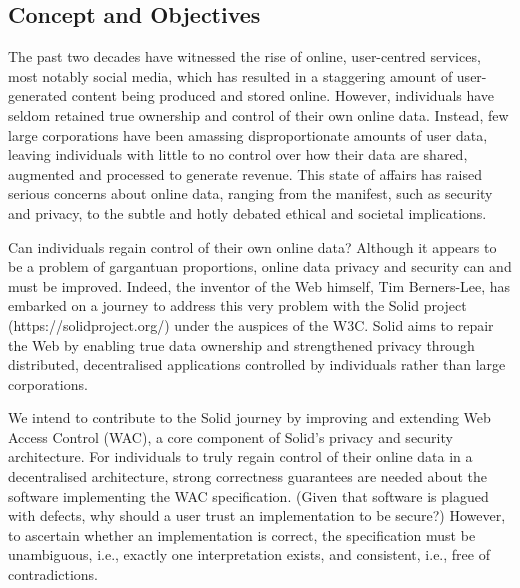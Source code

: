 \subsection{Concept and Objectives}

The past two decades have witnessed the rise of online, user-centred
services, most notably social media, which has resulted in a staggering
amount of user-generated content being produced and stored online.
However, individuals have seldom retained true ownership and control
of their own online data. Instead, few large corporations have been
amassing disproportionate amounts of user data, leaving individuals
with little to no control over how their data are shared, augmented
and processed to generate revenue. This state of affairs has raised
serious concerns about online data, ranging from the manifest, such
as security and privacy, to the subtle and hotly debated ethical and
societal implications.\cite{stremlau2018world}

Can individuals regain control of their own online data? Although
it appears to be a problem of gargantuan proportions, online data
privacy and security can and must be improved. Indeed, the inventor
of the Web himself, Tim Berners-Lee, has embarked on a journey to
address this very problem with the Solid project\cite{sambra2016solid}%
(https://solidproject.org/) under the auspices of the W3C. Solid aims
to repair the Web by enabling true data ownership and strengthened
privacy through distributed, decentralised applications controlled
by individuals rather than large corporations.

We intend to contribute to the Solid journey by improving and extending
Web Access Control (WAC), a core component of Solid's privacy and
security architecture. For individuals to truly regain control of
their online data in a decentralised architecture, strong correctness
guarantees are needed about the software implementing the WAC specification.
(Given that software is plagued with defects, why should a user trust
an implementation to be secure?) However, to ascertain whether an
implementation is correct, the specification must be unambiguous,
i.e., exactly one interpretation exists, and consistent, i.e., free
of contradictions.

